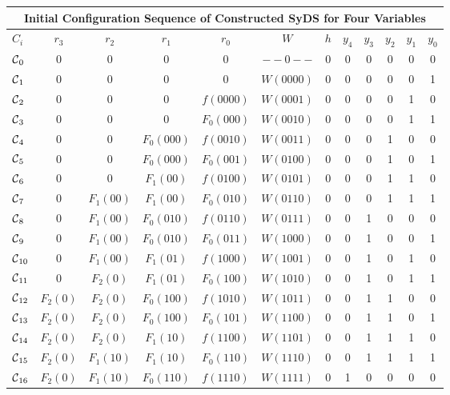 \begin{table*}
\begin{center}
\begin{tabular}{|l | c c c c c c c c c c c |} \hline
\multicolumn{12}{|c|}{{\bf Initial Configuration Sequence of 
Constructed SyDS for Four Variables}}\\ \hline

$C_i$ &$r_3$ & $r_2$ & $r_1$ & $r_0$ & $W$ & $h$ & $y_4$ & $y_3$ & $y_2$ & $y_1$ & $y_0$ \\ \hline
$\mbox{$\mathcal{C}$}_0$ & 0 & 0 & 0 & 0 & $--0--$ & 0 & 0 & 0 & 0 & 0 & 0 \\ 
$\mbox{$\mathcal{C}$}_1$ & 0 & 0 & 0 & 0 & $W(0000)$ & 0 & 0 & 0 & 0 & 0 & 1 \\ 
$\mbox{$\mathcal{C}$}_2$ & 0 & 0 & 0 & $f(0000)$ & $W(0001)$ & 0 & 0 & 0 & 0 & 1 & 0 \\ 
$\mbox{$\mathcal{C}$}_3$ & 0 & 0 & 0 & $F_0(000)$ & $W(0010)$ & 0 & 0 & 0 & 0 & 1 & 1 \\ 
$\mbox{$\mathcal{C}$}_4$ & 0 & 0 & $F_0(000)$ & $f(0010)$ & $W(0011)$ & 0 & 0 & 0 & 1 & 0 & 0 \\ 
$\mbox{$\mathcal{C}$}_5$ & 0 & 0 & $F_0(000)$ & $F_0(001)$ & $W(0100)$ & 0 & 0 & 0 & 1 & 0 & 1 \\ 
$\mbox{$\mathcal{C}$}_6$ & 0 & 0 & $F_1(00)$ & $f(0100)$ & $W(0101)$ & 0 & 0 & 0 & 1 & 1 & 0 \\ 
$\mbox{$\mathcal{C}$}_7$ & 0 & $F_1(00)$ &$F_1(00)$ & $F_0(010)$ & $W(0110)$ & 0 & 0 & 0 & 1 & 1 & 1 \\ 
$\mbox{$\mathcal{C}$}_8$ & 0 & $F_1(00)$ & $F_0(010)$ & $f(0110)$ & $W(0111)$ & 0 & 0 & 1 & 0 & 0 & 0 \\ 
$\mbox{$\mathcal{C}$}_9$ & 0 & $F_1(00)$ & $F_0(010)$ & $F_0(011)$ & $W(1000)$ & 0 & 0 & 1 & 0 & 0 & 1 \\ 
$\mbox{$\mathcal{C}$}_{10}$ & 0 & $F_1(00)$ & $F_1(01)$ & $f(1000)$ & $W(1001)$ & 0 & 0 & 1 & 0 & 1 & 0 \\ 
$\mbox{$\mathcal{C}$}_{11}$ & 0 & $F_2(0)$ & $F_1(01)$ & $F_0(100)$ & $W(1010)$ & 0 & 0 & 1 & 0 & 1 & 1 \\ 
$\mbox{$\mathcal{C}$}_{12}$ & $F_2(0)$& $F_2(0)$ & $F_0(100)$ & $f(1010)$ & $W(1011)$ & 0 & 0 & 1 & 1 & 0 & 0 \\ 
$\mbox{$\mathcal{C}$}_{13}$ & $F_2(0)$& $F_2(0)$ & $F_0(100)$ & $F_0(101)$ & $W(1100)$ & 0 & 0 & 1 & 1 & 0 & 1 \\ 
$\mbox{$\mathcal{C}$}_{14}$ & $F_2(0)$ & $F_2(0)$ & $F_1(10)$ & $f(1100)$ & $W(1101)$ & 0 & 0 & 1 & 1 & 1 & 0 \\ 
$\mbox{$\mathcal{C}$}_{15}$ & $F_2(0)$ & $F_1(10)$ & $F_1(10)$ & $F_0(110)$ & $W(1110)$ & 0 & 0 & 1 & 1 & 1 & 1 \\ 
$\mbox{$\mathcal{C}$}_{16}$ & $F_2(0)$ & $F_1(10)$ & $F_0(110)$ & $f(1110)$ & $W(1111)$ & 0 & 1 & 0 & 0 & 0 & 0 \\ 

\end{tabular}
\end{center}
\end{table*}
